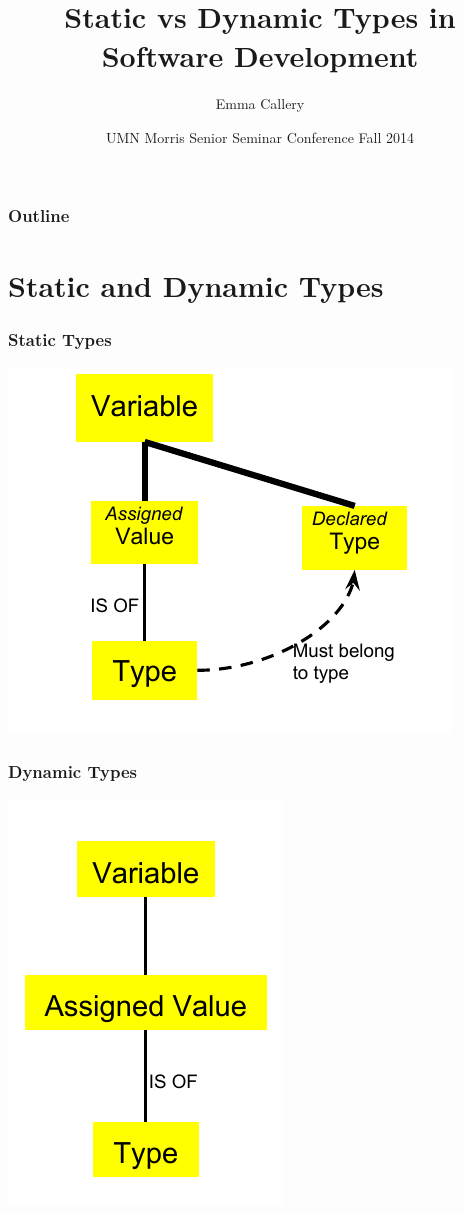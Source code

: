 \documentclass{beamer}
\begin{document}
\title{Static vs Dynamic Types in Software Development}
\author{Emma Callery}
\date[May 13, 2013]  
{UMN Morris Senior Seminar Conference Fall 2014}

\begin{frame}
  \titlepage
\end{frame}

\begin{frame}
	\frametitle{Outline}
\tableofcontents
\end{frame}

\section{Static and Dynamic Types}
\begin{frame}
	\frametitle{Static Types}
	\includegraphics{Static_Type_Diagram}
\end{frame}
\begin{frame}
	\frametitle{Dynamic Types}
	\includegraphics{Dynamic_Type_Diagram}
\end{frame}
\end{document}
